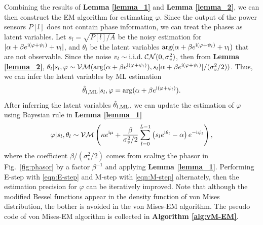 \documentclass[journal,twocolumn]{IEEEtran}
\theoremstyle{nonumberplain}
\def \arg {\text{arg}}
\def \CN {\mathcal{CN}}
\def \VM {\mathcal{VM}}
\def \ri {{\rm i}}
\begin{document}
    Combining the results of {\bf Lemma \ref{lemma_1}} and {\bf Lemma \ref{lemma_2}}, we can then construct the EM algorithm for estimating $\varphi$. Since the output of the power sensors $P[l]$ does not contain phase information, we can treat the phases as latent variables. Let $s_l = \sqrt{P[l]/A}$ be the noisy estimation for $|\alpha + \beta e^{{\ri} (\varphi + \psi_l)} + v_l|$, and $\theta_l$ be the latent variables $\arg (\alpha + \beta e^{{\ri} (\varphi + \psi_l)} + v_l)$ that are not observable. 
    Since the noise $v_l \sim {\rm i.i.d.}\;\CN(0, \sigma_v^2)$, then from {\bf Lemma \ref{lemma_2}}, $\theta_l | s_l, \varphi \sim \VM(\arg(\alpha + \beta e^{{\ri} (\varphi + \psi_l)}), s_l |\alpha + \beta e^{{\ri} (\varphi + \psi_l)}|/(\sigma_v^2/2))$. Thus, we can infer the latent variables by ML estimation 
    \begin{equation}
        \hat{\theta}_{l, {\rm ML}} | s_l, \varphi = \arg(\alpha + \beta e^{{\ri} (\varphi + \psi_l)}).
        \label{eqn:E-step}
    \end{equation}
    After inferring the latent variables $\hat{\theta}_{l, {\rm ML}}$, we can update the estimation of $\varphi$ using Bayesian rule in {\bf Lemma \ref{lemma_1}}
    \begin{equation}
        \varphi | s_l, \theta_l \sim \VM\left( \kappa e^{{\ri} \mu} + \frac{\beta}{\sigma_v^2/2}\sum_{l=0}^{L-1}{\left(s_l e^{{\ri}\theta_l}-\alpha\right)e^{-{\ri} \psi_l}}\right),
        \label{eqn:M-step}
    \end{equation}
    where the coefficient $\beta/(\sigma_v^2/2)$ comes from scaling the phasor in Fig.~\ref{fig:phasor} by a factor $\beta^{-1}$ and applying {\bf Lemma \ref{lemma_1}}.
    Performing E-step with \eqref{eqn:E-step} and M-step with \eqref{eqn:M-step} alternately, then the estimation precision for $\varphi$ can be iteratively improved. Note that although the modified Bessel functions appear in the density function of von Mises distribution, the bother is avoided in the von Mises-EM algorithm. The pseudo code of von Mises-EM algorithm is collected in {\bf Algorithm \ref{alg:vM-EM}}.
\end{document}
